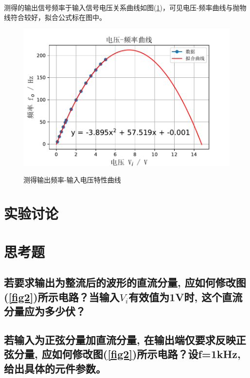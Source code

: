 \documentclass[a4paper]{article}
\begin{document}
测得的输出信号频率于输入信号电压关系曲线如图(\ref{Vfreq})，可见电压-频率曲线与抛物线符合较好，拟合公式标在图中。
\begin{figure}[!h]
\centering
\includegraphics[width=12cm]{fig/Vfreq.pdf}\\
\caption{测得输出频率-输入电压特性曲线}\label{Vfreq}
\end{figure}

\section{实验讨论}

\section{思考题}
\subsection{若要求输出为整流后的波形的直流分量, 应如何修改图(\ref{fig2})所示电路？当输入$V_i$有效值为1V时, 这个直流分量应为多少伏？}
\subsection{若输入为正弦分量加直流分量, 在输出端仅要求反映正弦分量, 应如何修改图(\ref{fig2})所示电路？设f=1kHz, 给出具体的元件参数。}

\nocite{jiaocai}

\end{document}
